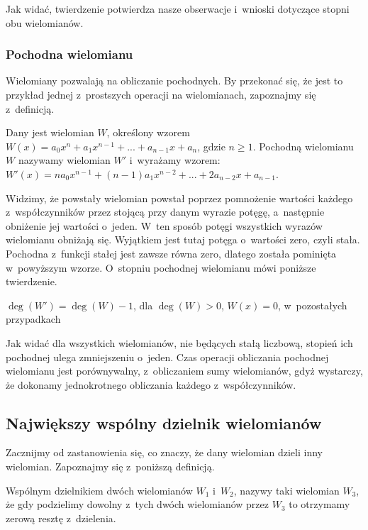 Jak widać, twierdzenie potwierdza nasze obserwacje i~wnioski dotyczące stopni obu wielomianów.

\subsubsection{Pochodna wielomianu}

Wielomiany pozwalają na obliczanie pochodnych. By przekonać się, że jest to przykład jednej z~prostszych operacji na wielomianach, zapoznajmy się z~definicją.

\begin{definition}
	$ $\\
	Dany jest wielomian $W$, określony wzorem $W(x) = a_0x^n + a_1x^{n-1} + ... + a_{n-1}x + a_n$, gdzie $n\ge1$. Pochodną wielomianu $W$ nazywamy wielomian $W'$ i~wyrażamy wzorem:
	$W'(x) = na_0x^{n-1} + (n-1) a_1x^{n-2} + ... + 2a_{n-2}x + a_{n-1}$.
\end{definition}

Widzimy, że powstały wielomian powstał poprzez pomnożenie wartości każdego z~współczynników przez stojącą przy danym wyrazie potęgę, a~następnie obniżenie jej wartości o~jeden. W~ten sposób potęgi wszystkich wyrazów wielomianu obniżają się. Wyjątkiem jest tutaj potęga o~wartości zero, czyli stała. Pochodna z~funkcji stałej jest zawsze równa zero, dlatego została pominięta w~powyższym wzorze. O~stopniu pochodnej wielomianu mówi poniższe twierdzenie.

\begin{theorem}
	$ $\\
	$\deg(W') = \deg(W) - 1$, dla $\deg(W) > 0$, $W(x) = 0$, w~pozostałych przypadkach
\end{theorem}

Jak widać dla wszystkich wielomianów, nie będących stałą liczbową, stopień ich pochodnej ulega zmniejszeniu o~jeden. Czas operacji obliczania pochodnej wielomianu jest porównywalny, z~obliczaniem sumy wielomianów, gdyż wystarczy, że dokonamy jednokrotnego obliczania każdego z~współczynników.

\subsection{Największy wspólny dzielnik wielomianów}

Zacznijmy od zastanowienia się, co znaczy, że dany wielomian dzieli inny wielomian. Zapoznajmy się z~poniższą definicją.

\begin{definition}
	$ $\\
	Wspólnym dzielnikiem dwóch wielomianów $W_1$ i~$W_2$, nazywy taki wielomian $W_3$, że gdy podzielimy dowolny z~tych dwóch wielomianów przez $W_3$ to otrzymamy zerową resztę z~dzielenia.
\end{definition}

